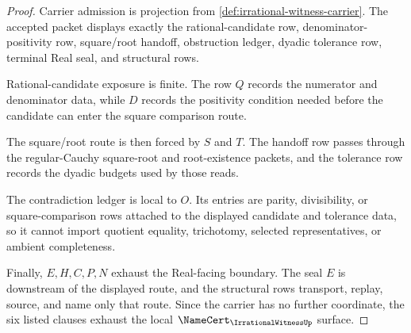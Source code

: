 \begin{proof}
Carrier admission is projection from \autoref{def:irrational-witness-carrier}. The accepted packet displays exactly the rational-candidate row, denominator-positivity row, square/root handoff, obstruction ledger, dyadic tolerance row, terminal Real seal, and structural rows.

Rational-candidate exposure is finite. The row $Q$ records the numerator and denominator data, while $D$ records the positivity condition needed before the candidate can enter the square comparison route.

The square/root route is then forced by $S$ and $T$. The handoff row passes through the regular-Cauchy square-root and root-existence packets, and the tolerance row records the dyadic budgets used by those reads.

The contradiction ledger is local to $O$. Its entries are parity, divisibility, or square-comparison rows attached to the displayed candidate and tolerance data, so it cannot import quotient equality, trichotomy, selected representatives, or ambient completeness.

Finally, $E,H,C,P,N$ exhaust the Real-facing boundary. The seal $E$ is downstream of the displayed route, and the structural rows transport, replay, source, and name only that route. Since the carrier has no further coordinate, the six listed clauses exhaust the local $\NameCert_{\IrrationalWitnessUp}$ surface.
\end{proof}

